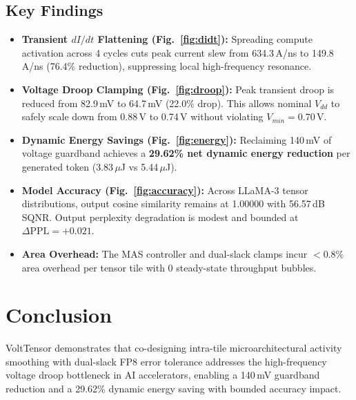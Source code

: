 \documentclass[conference]{IEEEtran}
\begin{document}
\subsection{Key Findings}
\begin{itemize}
    \item \textbf{Transient $dI/dt$ Flattening (Fig.~\ref{fig:didt}):} Spreading compute activation across 4 cycles cuts peak current slew from 634.3\,A/ns to 149.8\,A/ns (76.4\% reduction), suppressing local high-frequency resonance.
    \item \textbf{Voltage Droop Clamping (Fig.~\ref{fig:droop}):} Peak transient droop is reduced from 82.9\,mV to 64.7\,mV (22.0\% drop). This allows nominal $V_{dd}$ to safely scale down from 0.88\,V to 0.74\,V without violating $V_{min} = 0.70$\,V.
    \item \textbf{Dynamic Energy Savings (Fig.~\ref{fig:energy}):} Reclaiming 140\,mV of voltage guardband achieves a \textbf{29.62\% net dynamic energy reduction} per generated token (3.83\,$\mu$J vs 5.44\,$\mu$J).
    \item \textbf{Model Accuracy (Fig.~\ref{fig:accuracy}):} Across LLaMA-3 tensor distributions, output cosine similarity remains at 1.00000 with 56.57\,dB SQNR. Output perplexity degradation is modest and bounded at $\Delta\text{PPL} = +0.021$.
    \item \textbf{Area Overhead:} The MAS controller and dual-slack clamps incur $<0.8\%$ area overhead per tensor tile with 0 steady-state throughput bubbles.
\end{itemize}

\section{Conclusion}
VoltTensor demonstrates that co-designing intra-tile microarchitectural activity smoothing with dual-slack FP8 error tolerance addresses the high-frequency voltage droop bottleneck in AI accelerators, enabling a 140\,mV guardband reduction and a 29.62\% dynamic energy saving with bounded accuracy impact.



\end{document}
